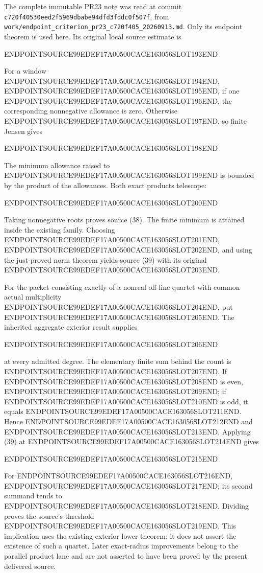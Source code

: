 The complete immutable PR23 note was read at commit \texttt{c720f40530eed2f5969dbabe94dfd3fddc0f507f}, from \texttt{work/endpoint\_criterion\_pr23\_c720f405\_20260913.md}. Only its endpoint theorem is used here. Its original local source estimate is

ENDPOINTSOURCE99EDEF17A00500CACE163056SLOT193END

For a window ENDPOINTSOURCE99EDEF17A00500CACE163056SLOT194END, ENDPOINTSOURCE99EDEF17A00500CACE163056SLOT195END, if one ENDPOINTSOURCE99EDEF17A00500CACE163056SLOT196END, the corresponding nonnegative allowance is zero. Otherwise ENDPOINTSOURCE99EDEF17A00500CACE163056SLOT197END, so finite Jensen gives

ENDPOINTSOURCE99EDEF17A00500CACE163056SLOT198END

The minimum allowance raised to ENDPOINTSOURCE99EDEF17A00500CACE163056SLOT199END is bounded by the product of the allowances. Both exact products telescope:

ENDPOINTSOURCE99EDEF17A00500CACE163056SLOT200END

Taking nonnegative roots proves source (38). The finite minimum is attained inside the existing family. Choosing ENDPOINTSOURCE99EDEF17A00500CACE163056SLOT201END, ENDPOINTSOURCE99EDEF17A00500CACE163056SLOT202END, and using the just-proved norm theorem yields source (39) with its original ENDPOINTSOURCE99EDEF17A00500CACE163056SLOT203END.

For the packet consisting exactly of a nonreal off-line quartet with common actual multiplicity ENDPOINTSOURCE99EDEF17A00500CACE163056SLOT204END, put ENDPOINTSOURCE99EDEF17A00500CACE163056SLOT205END. The inherited aggregate exterior result supplies

ENDPOINTSOURCE99EDEF17A00500CACE163056SLOT206END

at every admitted degree. The elementary finite sum behind the count is ENDPOINTSOURCE99EDEF17A00500CACE163056SLOT207END. If ENDPOINTSOURCE99EDEF17A00500CACE163056SLOT208END is even, ENDPOINTSOURCE99EDEF17A00500CACE163056SLOT209END; if ENDPOINTSOURCE99EDEF17A00500CACE163056SLOT210END is odd, it equals ENDPOINTSOURCE99EDEF17A00500CACE163056SLOT211END. Hence ENDPOINTSOURCE99EDEF17A00500CACE163056SLOT212END and ENDPOINTSOURCE99EDEF17A00500CACE163056SLOT213END. Applying (39) at ENDPOINTSOURCE99EDEF17A00500CACE163056SLOT214END gives

ENDPOINTSOURCE99EDEF17A00500CACE163056SLOT215END

For ENDPOINTSOURCE99EDEF17A00500CACE163056SLOT216END, ENDPOINTSOURCE99EDEF17A00500CACE163056SLOT217END; its second summand tends to ENDPOINTSOURCE99EDEF17A00500CACE163056SLOT218END. Dividing proves the source's threshold ENDPOINTSOURCE99EDEF17A00500CACE163056SLOT219END. This implication uses the existing exterior lower theorem; it does not assert the existence of such a quartet. Later exact-radius improvements belong to the parallel product lane and are not asserted to have been proved by the present delivered source.

